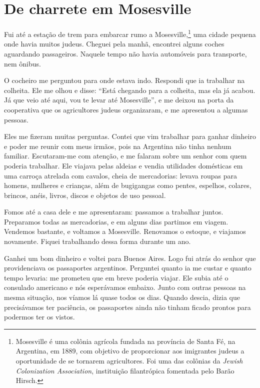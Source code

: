 \chapter{De charrete em Mosesville}

Fui até a estação de trem para embarcar rumo a 
Mosesville,\footnote{Mosesville é uma colônia agrícola fundada na província de
  Santa Fé, na Argentina, em 1889, com objetivo de proporcionar aos
  imigrantes judeus a oportunidade de se tornarem agricultores. Foi uma
  das colônias da \textit{Jewish Colonization Association}, instituição
  filantrópica fomentada pelo Barão Hirsch.} uma cidade pequena onde
havia muitos judeus. Cheguei pela manhã, encontrei alguns coches aguardando passageiros. Naquele tempo não havia
automóveis para transporte, nem ônibus.

O cocheiro me perguntou para onde estava indo. Respondi que ia 
trabalhar na colheita. Ele me olhou e disse: ``Está chegando para a
colheita, mas ela já acabou. Já que veio até aqui, vou te levar até
Mosesville'', e me deixou na porta da cooperativa que os agricultores
judeus organizaram, e me apresentou a algumas pessoas.

Eles me fizeram muitas perguntas. Contei que vim trabalhar para ganhar dinheiro e poder me reunir com meus irmãos, pois 
na Argentina não tinha nenhum familiar. Escutaram-me com
atenção, e me falaram sobre um senhor com quem poderia trabalhar. Ele
viajava pelas aldeias e vendia utilidades domésticas em uma carroça
atrelada com cavalos, cheia de mercadorias: levava roupas para homens,
mulheres e crianças, além de bugigangas como pentes, espelhos, colares,
brincos, anéis, livros, discos e objetos de uso pessoal.

Fomos até a casa dele e me apresentaram: passamos a trabalhar juntos.
Preparamos todas as mercadorias, e em alguns dias partimos em viagem. Vendemos bastante, e voltamos a Mosesville. Renovamos o estoque, e
viajamos novamente. Fiquei trabalhando dessa forma durante um ano.

Ganhei um bom dinheiro e voltei para Buenos Aires. Logo fui atrás do
senhor que providenciava os passaportes argentinos. Perguntei quanto ia me 
custar e quanto tempo levaria: me prometeu que em breve poderia viajar. 
Ele subia até o consulado americano e nós esperávamos embaixo. Junto com outras pessoas na mesma situação, nos víamos lá quase todos os dias. Quando descia, dizia
que precisávamos ter paciência, os passaportes ainda não tinham
ficado prontos para podermos ter os vistos.

